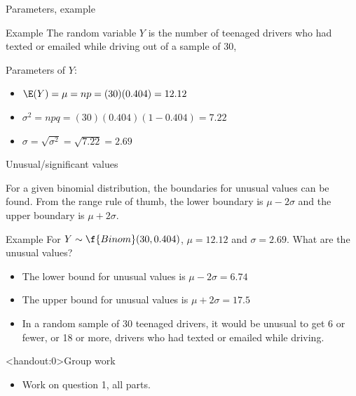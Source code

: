 \documentclass[xcolor=table, aspectratio=169, bigger, handout]{beamer}
\begin{document}
\begin{frame}{Parameters, example}
\begin{exampleblock}{Example}
The random variable $Y$ is the number of teenaged drivers who had texted or emailed while driving out of a sample of 30,\\ \smallskip
{}

Parameters of $Y$:
\begin{itemize}
\pause\item $\E(Y) = \mu = np = (30)(0.404) = 12.12$
\pause\item $\sigma^2 = npq = (30)(0.404)(1-0.404) = 7.22$
\pause\item $\sigma = \sqrt{\sigma^2} = \sqrt{7.22} = 2.69$
\end{itemize}
\end{exampleblock}
\end{frame}

\begin{frame}{Unusual/significant values}
\begin{block}{}
For a given binomial distribution, the boundaries for unusual values can be found. From the range rule of thumb, the lower boundary is $\mu - 2 \sigma$ and the upper boundary is $\mu + 2\sigma$.
\end{block}
\pause
\begin{exampleblock}{Example}
For $Y \sim \f{Binom}(30, 0.404)$, $\mu = 12.12$ and $\sigma = 2.69$. What are the unusual values?
\begin{itemize}
\pause\item The lower bound for unusual values is $\mu - 2 \sigma = 6.74$
\pause\item The upper bound for unusual values is $\mu + 2 \sigma = 17.5$
\pause\item In a random sample of 30 teenaged drivers, it would be unusual to get 6 or fewer, or 18 or more, drivers who had texted or emailed while driving.
\end{itemize}
\end{exampleblock}
\end{frame}

\begin{frame}<handout:0>{Group work}
\begin{block}{}
\large
\begin{itemize}
\item Work on question 1, all parts.
\end{itemize}
\end{block}
\end{frame}
\end{document}
